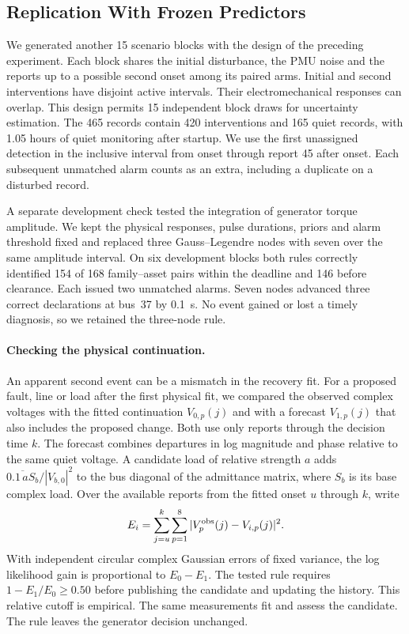 \subsection{Replication With Frozen Predictors}
\label{app:restoration-replication}

We generated another 15 scenario blocks with the design of the preceding
experiment. Each block shares the initial disturbance, the PMU noise and
the reports up to a possible second onset among its paired arms. Initial
and second interventions have disjoint active intervals. Their
electromechanical responses can overlap. This design permits 15
independent block draws for uncertainty estimation. The 465 records
contain 420 interventions and 165 quiet records, with 1.05 hours of
quiet monitoring after startup. We use the first unassigned detection
in the inclusive interval from onset through report 45 after onset.
Each subsequent unmatched alarm counts as an extra, including a
duplicate on a disturbed record.

A separate development check tested the integration of generator
torque amplitude. We kept the physical responses, pulse durations,
priors and alarm threshold fixed and replaced three Gauss--Legendre
nodes with seven over the same amplitude interval. On six development
blocks both rules correctly identified 154 of 168 family--asset pairs
within the deadline and 146 before clearance. Each issued two unmatched
alarms. Seven nodes advanced three correct declarations at bus~37 by
0.1~s. No event gained or lost a timely diagnosis, so we retained the
three-node rule.

\paragraph{Checking the physical continuation.}
An apparent second event can be a mismatch in the recovery fit. For
a proposed fault, line or load after the first physical fit, we
compared the observed complex voltages with the fitted continuation
$V_{0,p}(j)$ and with a forecast $V_{1,p}(j)$ that also includes the
proposed change. Both use only reports through the decision time $k$.
The forecast combines departures in log magnitude and phase relative to
the same quiet voltage. A candidate load of relative strength $a$
adds $\overline{0.1\,aS_b}/|V_{b,0}|^2$ to the bus diagonal of the
admittance matrix, where $S_b$ is its base complex load. Over the
available reports from the fitted onset $u$ through $k$, write
\[
 E_i=\sum_{j=u}^k\sum_{p=1}^{8}
         |V^{\rm obs}_{p}(j)-V_{i,p}(j)|^2 .
\]
With independent circular complex Gaussian errors of fixed variance,
the log likelihood gain is proportional to $E_0-E_1$. The tested rule
requires $1-E_1/E_0\geq 0.50$ before publishing the candidate and
updating the history. This relative cutoff is empirical. The same
measurements fit and assess the candidate. The rule leaves the
generator decision unchanged.

